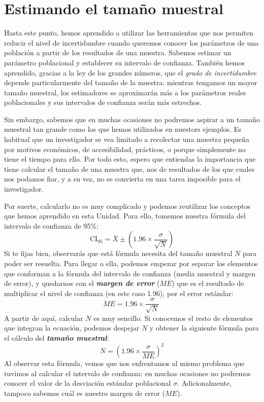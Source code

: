 \documentclass[spanish,]{book}
\begin{document}
\section{Estimando el tamaño muestral}\label{samplesize}

Hasta este punto, hemos aprendido a utilizar las herramientas que nos
permiten reducir el nivel de incertidumbre cuando queremos conocer los
parámetros de una población a partir de los resultados de una muestra.
Sabemos estimar un parámetro poblacional y establecer su intervalo de
confianza. También hemos aprendido, gracias a la ley de los grandes
números, que el \emph{grado de incertidumbre} depende particularmente
del tamaño de la muestra: mientras tengamos un mayor tamaño muestral,
los estimadores se aproximarán más a los parámetros reales poblacionales
y sus intervalos de confianza serán más estrechos.

Sin embargo, sabemos que en muchas ocasiones no podremos aspirar a un
tamaño muestral tan grande como los que hemos utilizados en nuestors
ejemplos. Es habitual que un investigador se vea limitado a recolectar
una muestra pequeña por motivos económicos, de accesibilidad, prácticos,
o porque simplemente no tiene el tiempo para ello. Por todo esto, espero
que entiendas la importancia que tiene calcular el tamaño de una muestra
que, nos de resultados de los que cuales nos podamos fiar, y a su vez,
no se convierta en una tarea imposible para el investigador.

Por suerte, calcularlo no es muy complicado y podemos reutilizar los
conceptos que hemos aprendido en esta Unidad. Para ello, tomemos nuestra
fórmula del intervalo de confianza de 95\%: \[
\mbox{CI}_{95} = \bar{X} \pm \left( 1.96 \times \frac{\sigma}{\sqrt{N}} \right)
\] Si te fijas bien, observarás que está fórmula necesita del tamaño
muestral \(N\) para poder ser resuelta. Para llegar a ella, podemos
empezar por separar los elementos que conforman a la fórmula del
intervalo de confianza (media muestral y margen de error), y quedarnos
con el \textbf{\emph{margen de error}} (\(ME\)) que es el resultado de
multiplicar el nivel de confianza (en este caso 1.96), por el error
estándar: \[
ME = 1.96 \times \frac{\sigma}{\sqrt{N}} \
\] A partir de aquí, calcular \(N\) es muy sencillo. Si conocemos el
resto de elementos que integran la ecuación, podemos despejar \(N\) y
obtener la siguiente fórmula para el cálculo del \textbf{\emph{tamaño
muestral}}: \[
N = \left( 1.96 \times \frac{\sigma}{ME} \right)^2
\] Al observar esta fórmula, vemos que nos enfrentamos al mismo problema
que tuvimos al calcular el intervalo de confianza: en muchas ocasiones
no podremos conocer el valor de la desviación estándar poblacional
\(\sigma\). Adicionalmente, tampoco sabemos cuál es nuestro margen de
error (\(ME\)).
\end{document}
